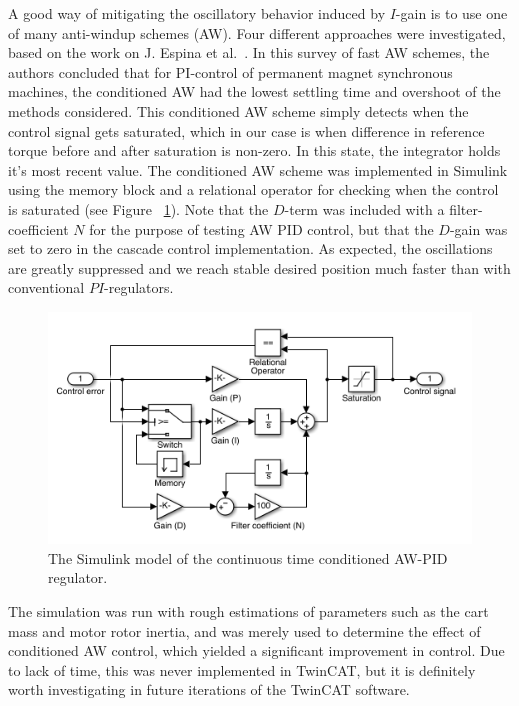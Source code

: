 \documentclass{article}
\begin{document}
A good way of mitigating the oscillatory behavior induced by $I$-gain is to use one of many anti-windup schemes (AW). Four different approaches were investigated, based on the work on J. Espina et al.~\cite{espina2009speed}. In this survey of fast AW schemes, the authors concluded that for PI-control of permanent magnet synchronous machines, the conditioned AW had the lowest settling time and overshoot of the methods considered. This conditioned AW scheme simply detects when the control signal gets saturated, which in our case is when difference in reference torque before and after saturation is non-zero. In this state, the integrator holds it's most recent value. The conditioned AW scheme was implemented in Simulink using the memory block and a relational operator for checking when the control is saturated (see Figure ~\ref{fig:AntiWindupSimulink}). Note that the $D$-term was included with a filter-coefficient $N$ for the purpose of testing AW PID control, but that the $D$-gain was set to zero in the cascade control implementation. As expected, the oscillations are greatly suppressed and we reach stable desired position much faster than with conventional $PI$-regulators.

\begin{figure}
\centering
\includegraphics[width = 0.5\linewidth]{figures/AntiwindupSimulink.png}
\caption{The Simulink model of the continuous time conditioned AW-PID regulator.}
\label{fig:AntiWindupSimulink}
\end{figure}

The simulation was run with rough estimations of parameters such as the cart mass and motor rotor inertia, and was merely used to determine the effect of conditioned AW control, which yielded a significant improvement in control. Due to lack of time, this was never implemented in TwinCAT, but it is definitely worth investigating in future iterations of the TwinCAT software.

\newpage{}

\end{document}
